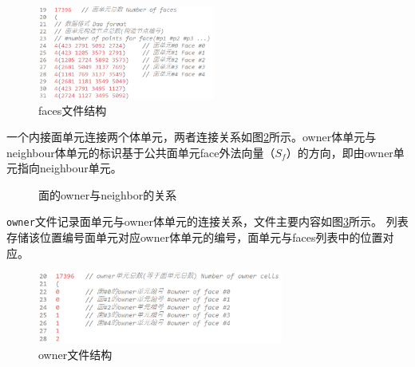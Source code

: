 \begin{figure}[htp]
	\centering
	\includegraphics[width=0.52\textwidth]{./figures/faces.png}
	\caption{faces文件结构}
	\label{fig:faces_file}	
\end{figure}

一个内接面单元连接两个体单元，两者连接关系如图\ref{fig:owner_neighbor}所示。owner体单元与neighbour体单元的标识基于公共面单元face外法向量（$S_f$）的方向，即由owner单元指向neighbour单元。

\begin{figure}[htb]
	\centering
	 \qquad
	\caption{面的owner与neighbor的关系}
	\label{fig:owner_neighbor}
\end{figure}

\texttt{owner}文件记录面单元与owner体单元的连接关系，文件主要内容如图\ref{fig:owner_file}所示。
列表存储该位置编号面单元对应owner体单元的编号，面单元与faces列表中的位置对应。


\begin{figure}[htp]
	\centering
	\includegraphics[width=0.72\textwidth]{./figures/owner.png}
	\caption{owner文件结构}
	\label{fig:owner_file}	
\end{figure}


